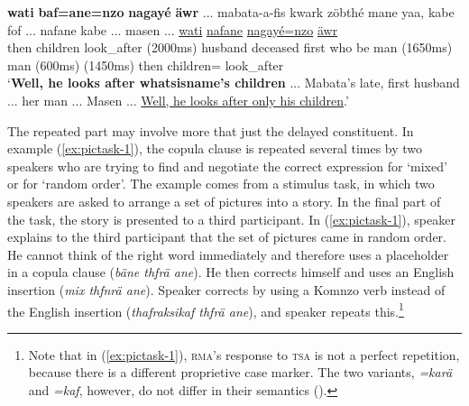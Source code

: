 \documentclass[output=paper,colorlinks,citecolor=brown]{langscibook}
\begin{document}
\ea \label{ex:masen}
    \gll \textbf{wati} \textbf{baf=ane=nzo} \textbf{nagayé} \textbf{äwr} ... mabata-a-fis kwark zöbthé mane yaa, kabe fof ... nafane kabe ... masen ... \uline{wati} \uline{nafane} \uline{nagayé=nzo} \uline{äwr}\\
    then  children look\_after (2000ms) husband deceased first who be man  (1650ms)  man (600ms)  (1450ms) then  children= look\_after\\
    \glt `\textbf{Well, he looks after whatsisname's children} ... Mabata's late, first husband  ... her man ... Masen ... \uline{Well, he looks after only his children}.' 
\z

The repeated part may involve more that just the delayed constituent. In example (\ref{ex:pictask-1}), the copula clause is repeated several times by two speakers who are trying to find and negotiate the correct expression for `mixed' or for `random order'. The example comes from a stimulus task, in which two speakers are asked to arrange a set of pictures into a story. In the final part of the task, the story is presented to a third participant. In (\ref{ex:pictask-1}), speaker  explains to the third participant that the set of pictures came in random order. He cannot think of the right word immediately and therefore uses a placeholder in a copula clause (\textit{bäne thfrä ane}). He then corrects himself and uses an English insertion (\textit{mix thfnrä ane}). Speaker  corrects  by using a Komnzo verb instead of the English insertion (\textit{thafraksikaf thfrä ane}), and speaker  repeats this.\footnote{Note that in (\ref{ex:pictask-1}), \textsc{rma}'s response to \textsc{tsa} is not a perfect repetition, because there is a different proprietive case marker. The two variants, \textit{=karä} and \textit{=kaf}, however, do not differ in their semantics (\cite[161ff.]{Dohler:2018qt}).}
\end{document}
